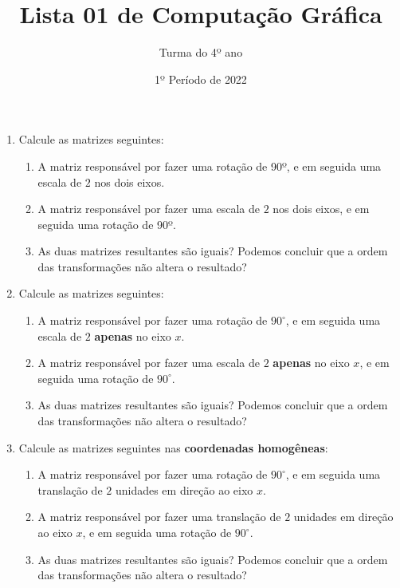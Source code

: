 \documentclass[12pt]{article}
\title{Lista 01 de Computação Gráfica}
\date{1º Período de 2022}
\author{Turma do 4º ano}
\begin{document}
\maketitle

\begin{enumerate}


\item Calcule as matrizes seguintes:

\begin{enumerate}

\item A matriz responsável por fazer uma rotação de 90º, e em seguida uma escala de $2$ nos dois eixos.

\item A matriz responsável por fazer uma escala de $2$ nos dois eixos, e em seguida uma rotação de 90º.

\item As duas matrizes resultantes são iguais? Podemos concluir que a ordem das transformações não altera o resultado?

\end{enumerate}

\item Calcule as matrizes seguintes:

\begin{enumerate}

\item A matriz responsável por fazer uma rotação de $90^\circ$, e em seguida uma escala de $2$ \textbf{apenas} no eixo $x$.

\item A matriz responsável por fazer uma escala de $2$ \textbf{apenas} no eixo $x$, e em seguida uma rotação de $90^\circ$.

\item As duas matrizes resultantes são iguais? Podemos concluir que a ordem das transformações não altera o resultado?

\end{enumerate}

\item Calcule as matrizes seguintes nas \textbf{coordenadas homogêneas}:

\begin{enumerate}

\item A matriz responsável por fazer uma rotação de $90^\circ$, e em seguida uma translação de $2$ unidades em direção ao eixo $x$.

\item A matriz responsável por fazer uma translação de $2$ unidades em direção ao eixo $x$, e em seguida uma rotação de $90^\circ$.

\item As duas matrizes resultantes são iguais? Podemos concluir que a ordem das transformações não altera o resultado?

\end{enumerate}


\end{enumerate}
\end{document}
